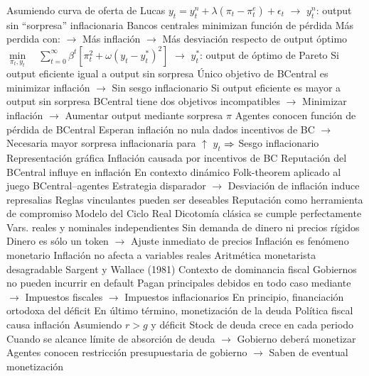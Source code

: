 \documentclass{nuevotema}
\begin{document}
\begin{esquemal}
				\4 Asumiendo curva de oferta de Lucas
				\4[] $y_t = y_t^n + \lambda (\pi_t - \pi_t^e )+\epsilon_t$
				\4[] $\to$ $y_t^n$: output sin ``sorpresa'' inflacionaria
				\4 Bancos centrales minimizan función de pérdida
				\4[] Más perdida con:
				\4[] $\to$ Más inflación
				\4[] $\to$ Más desviación respecto de output óptimo
				\4[] $\underset{\pi_t,y_t}{\min} \quad \sum_{t=0}^\infty \beta^t \left[ \pi_t^2 + \omega (y_t - y_t^*)^2 \right]$
				\4[] $\to$ $y_t^*$: output de óptimo de Pareto
				\4 Si output eficiente igual a output sin sorpresa
				\4[] Único objetivo de BCentral es minimizar inflación
				\4[] $\to$ Sin sesgo inflacionario
				\4 Si output eficiente es mayor a output sin sorpresa
				\4[] BCentral tiene dos objetivos incompatibles
				\4[] $\to$ Minimizar inflación
				\4[] $\to$ Aumentar output mediante sorpresa $\pi$
				\4 Agentes conocen función de pérdida de BCentral
				\4[] Esperan inflación no nula dados incentivos de BC
				\4[] $\to$ Necesaria mayor sorpresa inflacionaria para $\uparrow$ $y_t$
				\4[] $\then$ Sesgo inflacionario
				\4 Representación gráfica
				\4[] 
				\4[$\then$] Inflación causada por incentivos de BC
				\4[$\then$] Reputación del BCentral influye en inflación
				\4[] En contexto dinámico
				\4[] Folk-theorem aplicado al juego BCentral--agentes
				\4[] Estrategia disparador
				\4[] $\to$ Desviación de inflación induce represalias
				\4[$\then$] Reglas vinculantes pueden ser deseables
				\4[$\then$] Reputación como herramienta de compromiso
			\3 Modelo del Ciclo Real
				\4 Dicotomía clásica se cumple perfectamente
				\4[] Vars. reales y nominales independientes
				\4 Sin demanda de dinero ni precios rígidos
				\4[] Dinero es sólo un token
				\4[] $\to$ Ajuste inmediato de precios
				\4[$\then$] Inflación es fenómeno monetario
				\4[$\then$] Inflación no afecta a variables reales
			\3 Aritmética monetarista desagradable
				\4 Sargent y Wallace (1981)
				\4 Contexto de dominancia fiscal
				\4[] Gobiernos no pueden incurrir en default
				\4[] Pagan principales debidos en todo caso mediante
				\4[] $\to$ Impuestos fiscales
				\4[] $\to$ Impuestos inflacionarios
				\4[] En principio, financiación ortodoxa del déficit
				\4[] En último término, monetización de la deuda
				\4 Política fiscal causa inflación
				\4[] Asumiendo $r> g$ y déficit
				\4[] Stock de deuda crece en cada periodo
				\4[] Cuando se alcance límite de absorción de deuda
				\4[] $\to$ Gobierno deberá monetizar
				\4[] Agentes conocen restricción presupuestaria de gobierno
				\4[] $\to$ Saben de eventual monetización

\end{esquemal}
\end{document}
